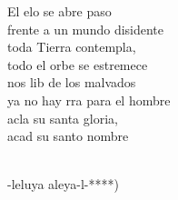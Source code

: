 \documentclass[12pt]{article}
\begin{document}
\begin{multicols*}{2}
\begin{cancion}
	El elo se abre paso \\
frente a un mundo disidente\\
	toda  Tierra contempla, \\
todo el orbe se estremece\\
	nos lib de los malvados  \\
	ya no hay rra para el hombre\\
	acla su santa gloria,\\
	 acad su santo nombre\\\jump\\
	\begin{chorus}%
	-leluya aleya-l-*)\\
	\end{chorus}%
	\jump\\
\end{cancion}%


\end{multicols*}
\end{document}
